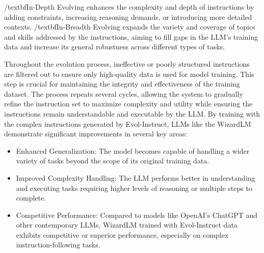 \begin{itemize}
{		      /textbf{In-Depth Evolving} enhances the complexity and depth of instructions by adding constraints, increasing reasoning demands, or introducing more detailed contexts.
		      /textbf{In-Breadth Evolving} expands the variety and coverage of topics and skills addressed by the instructions, aiming to fill gaps in the LLM’s training data and increase its general robustness across different types of tasks.

		      Throughout the evolution process, ineffective or poorly structured instructions are filtered out to ensure only high-quality data is used for model training. This step is crucial for maintaining the integrity and effectiveness of the training dataset.
		      The process repeats several cycles, allowing the system to gradually refine the instruction set to maximize complexity and utility while ensuring the instructions remain understandable and executable by the LLM.
		      By training with the complex instructions generated by Evol-Instruct, LLMs like the WizardLM demonstrate significant improvements in several key areas:
		      \begin{itemize}
			      \item Enhanced Generalization: The model becomes capable of handling a wider variety of tasks beyond the scope of its original training data.
			      \item Improved Complexity Handling: The LLM performs better in understanding and executing tasks requiring higher levels of reasoning or multiple steps to complete.
			      \item Competitive Performance: Compared to models like OpenAI's ChatGPT and other contemporary LLMs, WizardLM trained with Evol-Instruct data exhibits competitive or superior performance, especially on complex instruction-following tasks.
		      \end{itemize}
	      }
\end{itemize}


